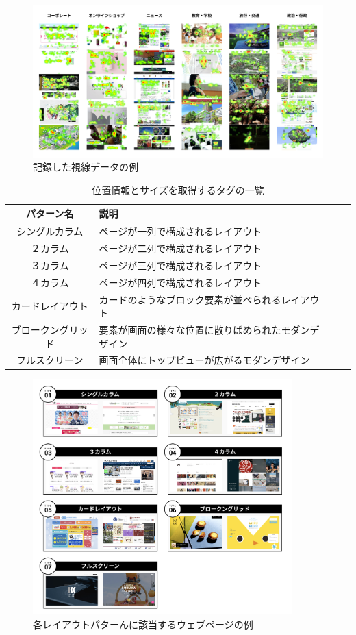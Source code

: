 \begin{figure}[H]
  \centering
  \includegraphics[width=12.5cm]{figures/05_dataset_saliency.jpg}
  \caption{記録した視線データの例}
  \label{fig_dataset-saliency}
\end{figure}

\begin{table}[h]
  \caption{位置情報とサイズを取得するタグの一覧}
  \label{table:layoutpattern}
  \centering
    \begin{tabular}{clll}
    \hline
    パターン名 & 説明 \\
    \hline \hline
    シングルカラム & ページが一列で構成されるレイアウト \\
    ２カラム & ページが二列で構成されるレイアウト \\
    ３カラム & ページが三列で構成されるレイアウト \\
    ４カラム & ページが四列で構成されるレイアウト \\
    カードレイアウト & カードのようなブロック要素が並べられるレイアウト \\
    ブロークングリッド & 要素が画面の様々な位置に散りばめられたモダンデザイン \\
    フルスクリーン & 画面全体にトップビューが広がるモダンデザイン \\
    \hline
  \end{tabular}
\end{table}

\begin{figure}[H]
  \centering
  \includegraphics[width=10cm]{figures/05_layout.jpg}
  \caption{各レイアウトパターんに該当するウェブページの例}
  \label{fig_layout_example}
\end{figure}

